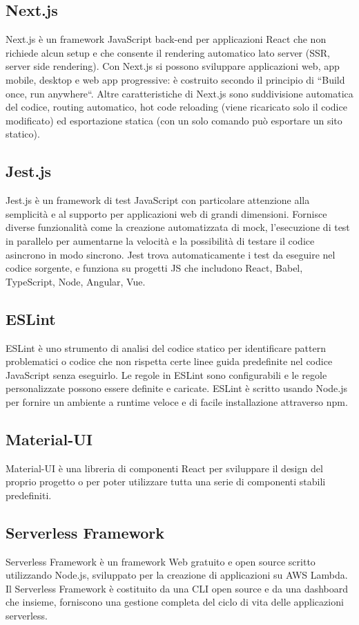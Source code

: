 \subsection{Next.js}
Next.js è un framework JavaScript back-end per applicazioni React che non richiede alcun setup e che consente il rendering automatico lato server (SSR, server side rendering).
Con Next.js si possono sviluppare applicazioni web, app mobile, desktop e web app progressive: è costruito secondo il principio di “Build once, run anywhere“.
Altre caratteristiche di Next.js sono suddivisione automatica del codice, routing automatico, hot code reloading (viene ricaricato solo il codice modificato) ed esportazione statica (con un solo comando può esportare un sito statico).
\subsection{Jest.js}
Jest.js è un framework di test JavaScript con particolare attenzione alla semplicità e al supporto per applicazioni web di grandi dimensioni.  Fornisce diverse funzionalità come la creazione automatizzata di mock, l'esecuzione di test in parallelo per aumentarne la velocità e la possibilità di testare il codice asincrono in modo sincrono. Jest trova automaticamente i test da eseguire nel codice sorgente, e funziona su progetti JS che includono React, Babel, TypeScript, Node, Angular, Vue.
\subsection{ESLint}
ESLint è uno strumento di analisi del codice statico per identificare pattern problematici o codice che non rispetta certe linee guida predefinite nel codice JavaScript senza eseguirlo. Le regole in ESLint sono configurabili e le regole personalizzate possono essere definite e caricate. ESLint è scritto usando Node.js per fornire un ambiente a runtime veloce e di facile installazione attraverso npm.
\subsection{Material-UI}
Material-UI è una libreria di componenti React per sviluppare il design del proprio progetto o per poter utilizzare tutta una serie di componenti stabili predefiniti.
\subsection{Serverless Framework}
Serverless Framework è un framework Web gratuito e open source scritto utilizzando Node.js, sviluppato per la creazione di applicazioni su AWS Lambda. Il Serverless Framework è costituito da una CLI open source e da una dashboard che insieme, forniscono una gestione completa del ciclo di vita delle applicazioni serverless.
